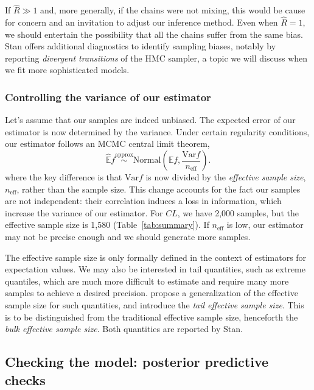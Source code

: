 If $\hat R \gg 1$ and, more generally, if the chains were not mixing, this would be cause for concern and an invitation to adjust our inference method.
Even when $\hat R = 1$, we should entertain the possibility that all the chains suffer from the same bias.
Stan offers additional diagnostics to identify sampling biases, notably by reporting \textit{divergent transitions} of the HMC sampler, a topic we will discuss when we fit more sophisticated models.

\subsubsection{Controlling the variance of our estimator}

Let's assume that our samples are indeed unbiased.
The expected error of our estimator is now determined by the variance.
Under certain regularity conditions, our estimator follows an MCMC central limit theorem,
\begin{equation*}
  \hat {\mathbb E} f \overset{\mathrm{approx}}{\sim} \mathrm{Normal} \left ( \mathbb E f, \frac{\mathrm{Var} f}{n_\mathrm{eff}} \right ).
\end{equation*}
where the key difference is that $\mathrm{Var} f$ is now divided by the \textit{effective sample size}, $n_\mathrm{eff}$, rather than the sample size.
This change accounts for the fact our samples are not independent: their correlation induces a loss in information, which increase the variance of our estimator.
For $CL$, we have 2,000 samples, but the effective sample size is 1,580 (Table~\ref{tab:summary}).
If $n_\mathrm{eff}$ is low, our estimator may not be precise enough and we should generate more samples.

The effective sample size is only formally defined in the context of estimators for expectation values.
We may also be interested in tail quantities, such as extreme quantiles, which are much more difficult to estimate and require many more samples to achieve a desired precision.
\citet{Vehtari:2020} propose a generalization of the effective sample size for such quantities, and introduce the \textit{tail effective sample size}.
This is to be distinguished from the traditional effective sample size, henceforth the \textit{bulk effective sample size}.
Both quantities are reported by Stan.

\subsection{Checking the model: posterior predictive checks}  \label{sec:twoCpt_ppc}

